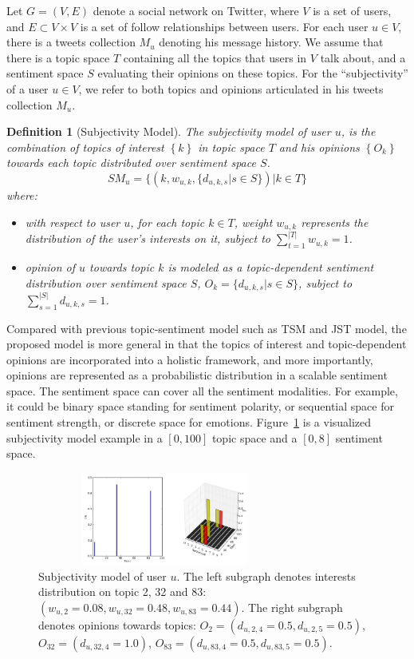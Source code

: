 \documentclass[letterpaper]{article}
\newtheorem{definition}{Definition}
\begin{document}
Let $G=\left( V,E \right) $ denote a social network on Twitter, where $ V $ is a set of users, and $ E\subset V\times V $ is a set of follow relationships between users. For each user $ u \in V $, there is a tweets collection $ M_{u} $ denoting his message history. We assume that there is a topic space $ T $ containing all the topics that users in $ V $ talk about, and a sentiment space $ S $ evaluating their opinions on these topics. 
For the ``subjectivity'' of a user $ u  \in V $, we refer to both topics and opinions articulated in his tweets collection $ M_{u} $.  
\begin{definition}[Subjectivity Model]
The subjectivity model of user $ u $, is the combination of topics of interest $\left\lbrace  k \right\rbrace $ in topic space $T$ and his opinions $\left\lbrace O_{k}\right\rbrace $ towards each topic distributed over sentiment space $ S $. 
\begin{equation*}
\label{usermodel}
SM_{u}  = \lbrace \left( k, w_{u,k} , \lbrace d_{u,k,s} |s \in S \rbrace \right) |  k \in T \rbrace
\end{equation*}
where:
\begin{itemize}
\item with respect to user $ u $, for each topic $k \in T$, weight $ w_{u,k} $ represents the distribution of the user's interests on it, subject to $ \sum_{t=1}^{|T|}w_{u,k} =1 $.
\item opinion of $ u $ towards topic $k$ is modeled as a topic-dependent sentiment distribution over sentiment space $ S $, $O_{k}=\lbrace d_{u,k,s}|s \in S \rbrace $, subject to $ \sum_{s=1}^{|S|} d_{u,k,s}=1$.
\end{itemize}
\end{definition}
Compared with previous topic-sentiment model such as TSM and JST model, the proposed model is more general in that the topics of interest and topic-dependent opinions are incorporated into a holistic framework, and more importantly, opinions are represented as a probabilistic distribution in a scalable sentiment space. The sentiment space can cover all the sentiment modalities. For example, it could be binary space standing for sentiment polarity, or sequential space for sentiment strength, or discrete space for emotions. 
Figure~\ref{fig0} is a visualized subjectivity model example in a $ [0,100] $ topic space and a $ [0,8] $ sentiment space. 
\begin{figure}[t]
\includegraphics[width=3.3in,height=1.2in]{fig1.pdf}
\caption{Subjectivity model of user $u$. The left subgraph denotes interests distribution on topic 2, 32 and 83: $ (  w_{u,2}=0.08,w_{u,32}=0.48, w_{u,83}=0.44)  $. The right subgraph denotes opinions towards topics: $ O_{2}=( d_{u,2,4} =0.5, d_{u,2,5} =0.5)$, $O_{32}=(d_{u,32,4}=1.0) $, $ O_{83}=( d_{u,83,4}=0.5, d_{u,83,5}=0.5 ) $.}
\label{fig0}
\end{figure}
\end{document}
